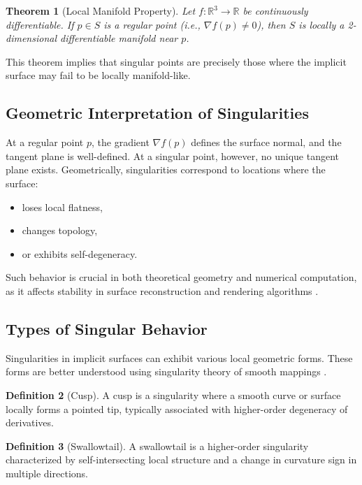 \documentclass[12pt, a4paper, oneside]{book}
\theoremstyle{plain}
\newtheorem{theorem}{Theorem}[chapter]
\theoremstyle{definition}
\newtheorem{definition}[theorem]{Definition}
\theoremstyle{remark}
\theoremstyle{definition}
\begin{document}
\begin{theorem}[Local Manifold Property]
Let $f:\mathbb{R}^3 \rightarrow \mathbb{R}$ be continuously differentiable. If $p \in S$ is a regular point (i.e., $\nabla f(p) \neq 0$), then $S$ is locally a 2-dimensional differentiable manifold near $p$.
\end{theorem}

This theorem implies that singular points are precisely those where the implicit surface may fail to be locally manifold-like.

\subsection{Geometric Interpretation of Singularities}

At a regular point $p$, the gradient $\nabla f(p)$ defines the surface normal, and the tangent plane is well-defined. At a singular point, however, no unique tangent plane exists. Geometrically, singularities correspond to locations where the surface:
\begin{itemize}
    \item loses local flatness,
    \item changes topology,
    \item or exhibits self-degeneracy.
\end{itemize}

Such behavior is crucial in both theoretical geometry and numerical computation, as it affects stability in surface reconstruction and rendering algorithms \cite{bloomenthal2000implicit}.

\subsection{Types of Singular Behavior}

Singularities in implicit surfaces can exhibit various local geometric forms. These forms are better understood using singularity theory of smooth mappings \cite{arnold2012singularities}.

\begin{definition}[Cusp]
A cusp is a singularity where a smooth curve or surface locally forms a pointed tip, typically associated with higher-order degeneracy of derivatives.
\end{definition}

\begin{definition}[Swallowtail]
A swallowtail is a higher-order singularity characterized by self-intersecting local structure and a change in curvature sign in multiple directions.
\end{definition}
\end{document}
